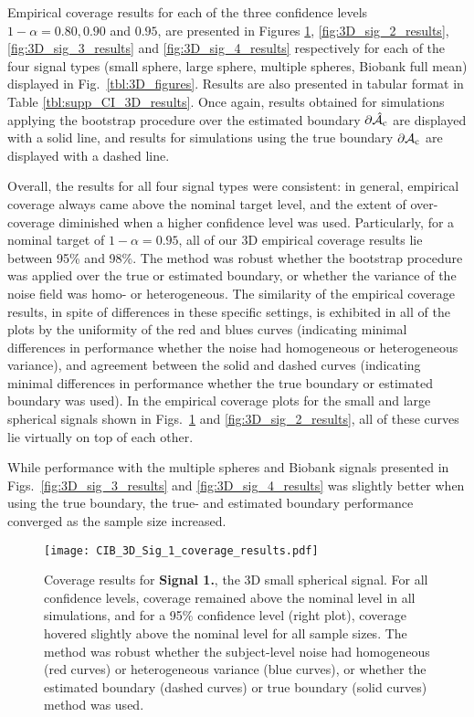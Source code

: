 Empirical coverage results for each of the three confidence levels $1 - \alpha = 0.80, 0.90$ and $0.95$, are presented in Figures \ref{fig:3D_sig_1_results}, \ref{fig:3D_sig_2_results}, \ref{fig:3D_sig_3_results} and \ref{fig:3D_sig_4_results} respectively for each of the four signal types (small sphere, large sphere, multiple spheres, Biobank full mean) displayed in Fig.\ \ref{tbl:3D_figures}. Results are also presented in tabular format in Table \ref{tbl:supp_CI_3D_results}. Once again, results obtained for simulations applying the bootstrap procedure over the estimated boundary $\operatorname{\partial\hat{\mathcal{A}}_{c}}$ are displayed with a solid line, and results for simulations using the true boundary $\operatorname{\partial\mathcal{A}_{c}}$ are displayed with a dashed line.

Overall, the results for all four signal types were consistent: in general, empirical coverage always came above the nominal target level, and the extent of over-coverage diminished when a higher confidence level was used. Particularly, for a nominal target of $1 - \alpha = 0.95$, all of our 3D empirical coverage results lie between 95\% and 98\%. The method was robust whether the bootstrap procedure was applied over the true or estimated boundary, or whether the variance of the noise field was homo- or heterogeneous. The similarity of the empirical coverage results, in spite of differences in these specific settings, is exhibited in all of the plots by the uniformity of the red and blues curves (indicating minimal differences in performance whether the noise had homogeneous or heterogeneous variance), and agreement between the solid and dashed curves (indicating minimal differences in performance whether the true boundary or estimated boundary was used). In the empirical coverage plots for the small and large spherical signals shown in Figs.\ \ref{fig:3D_sig_1_results} and \ref{fig:3D_sig_2_results}, all of these curves lie virtually on top of each other. 

While performance with the multiple spheres and Biobank signals presented in Figs.\ \ref{fig:3D_sig_3_results} and \ref{fig:3D_sig_4_results} was slightly better when using the true boundary, the true- and estimated boundary performance converged as the sample size increased.

\begin{figure}[htbp]
\hspace*{-1.5cm}
    \texttt{[image: CIB\_3D\_Sig\_1\_coverage\_results.pdf]}
\caption{Coverage results for \textbf{Signal 1.}, the 3D small spherical signal. For all confidence levels, coverage remained above the nominal level in all simulations, and for a 95\% confidence level (right plot), coverage hovered slightly above the nominal level for all sample sizes. The method was robust whether the subject-level noise had homogeneous (red curves) or heterogeneous variance (blue curves), or whether the estimated boundary (dashed curves) or true boundary (solid curves) method was used.}
\label{fig:3D_sig_1_results}
\end{figure}

